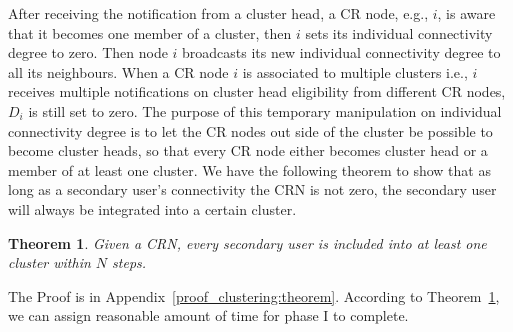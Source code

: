 \documentclass[10pt,journal,compsoc]{IEEEtran}
\makeatletter
\theoremstyle{mytheoremstyle}
\newtheorem{theorem}{Theorem}[section]
\theoremstyle{mytheoremstyle}
\theoremstyle{mytheoremstyle}
\renewenvironment{proof}[1][\proofname]{%
      \par\pushQED{\qed}\fontfamily{ptm}\selectfont%
      \topsep6\p@\@plus6\p@\relax
      \trivlist\item[\hskip\labelsep\bfseries#1\@addpunct{.}]%
      \ignorespaces
    }{%
      \popQED\endtrivlist\@endpefalse
    }
\newcommand{\eg}{e.g., }
\newcommand{\ie}{i.e., }
\makeatother
\begin{document}
After receiving the notification from a cluster head, a CR node, \eg $i$, is aware that it becomes one member of a cluster, then $i$ sets its individual connectivity degree to zero. %
Then node $i$ broadcasts its new individual connectivity degree to all its neighbours. 
When a CR node $i$ is associated to multiple clusters \ie $i$ receives multiple notifications on cluster head eligibility from different CR nodes, $D_i$ is still set to zero. %
%
%
The purpose of this temporary manipulation on individual connectivity degree is to let the CR nodes out side of the cluster be possible to become cluster heads, so that every CR node either becomes cluster head or a member of at least one cluster.
We have the following theorem to show that as long as a secondary user's connectivity the CRN is not zero, the secondary user will always be integrated into a certain cluster.
\begin{theorem}
\label{clustering:theorem}
Given a CRN, every secondary user is included into at least one cluster within $N$ steps.
\end{theorem}
The Proof is in Appendix~\ref{proof_clustering:theorem}.
According to Theorem~\ref{clustering:theorem}, we can assign reasonable amount of time for phase I to complete.
\end{document}
